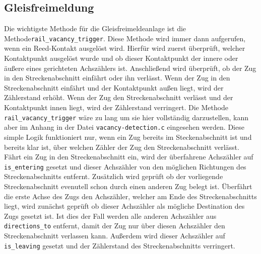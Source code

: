 \subsection{Gleisfreimeldung}\label{text:Entwicklung-der-GFA:Implementierung-der-Gleisfreimeldeanlage:Implementierung-der-Gleisfreimeldeanlage}
Die wichtigste Methode für die Gleisfreimeldeanlage ist die Methode\newline \texttt{rail\_vacancy\_trigger}. Diese Methode wird immer dann aufgerufen, wenn ein Reed-Kontakt ausgelöst wird. Hierfür wird zuerst überprüft, welcher Kontaktpunkt ausgelöst wurde und ob dieser Kontaktpunkt der innere oder äußere eines gerichteten Achszählers ist. Anschließend wird überprüft, ob der Zug in den Streckenabschnitt einfährt oder ihn verlässt. Wenn der Zug in den Streckenabschnitt einfährt und der Kontaktpunkt außen liegt, wird der Zählerstand erhöht. Wenn der Zug den Streckenabschnitt verlässt und der Kontaktpunkt innen liegt, wird der Zählerstand verringert. Die Methode \texttt{rail\_vacancy\_trigger} wäre zu lang um sie hier vollständig darzustellen, kann aber im Anhang in der Datei \texttt{vacancy-detection.c} eingesehen werden.
\newline
Diese simple Logik funktioniert nur, wenn ein Zug bereits im Steckenabschnitt ist und bereits klar ist, über welchen Zähler der Zug den Streckenabschnitt verlässt.
\newline
Fährt ein Zug in den Streckenabschnitt ein, wird der überfahrene Achszähler auf \texttt{is\_entering} gesetzt und dieser Achszähler von den möglichen Richtungen des Streckenabschnitts entfernt. Zusätzlich wird geprüft ob der vorliegende Streckenabschnitt evenutell schon durch einen anderen Zug belegt ist.
\newline
Überfährt die erste Achse des Zugs den Achszähler, welcher am Ende des Streckenabschnitts liegt, wird zunächst geprüft ob dieser Achszähler als mögliche Destination des Zugs gesetzt ist. Ist dies der Fall werden alle anderen Achszähler aus \texttt{directions\_to} entfernt, damit der Zug nur über diesen Achszähler den Streckenabschnitt verlassen kann. Außerdem wird dieser Achszähler auf \texttt{is\_leaving} gesetzt und der Zählerstand des Streckenabschnitts verringert.
